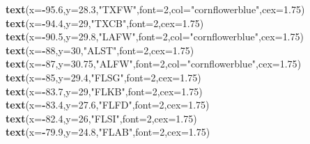 \documentclass[11pt,]{article}
\newenvironment{Shaded}{\begin{snugshade}}{\end{snugshade}}
\newcommand{\KeywordTok}[1]{\textcolor[rgb]{0.13,0.29,0.53}{\textbf{#1}}}
\newcommand{\DataTypeTok}[1]{\textcolor[rgb]{0.13,0.29,0.53}{#1}}
\newcommand{\DecValTok}[1]{\textcolor[rgb]{0.00,0.00,0.81}{#1}}
\newcommand{\FloatTok}[1]{\textcolor[rgb]{0.00,0.00,0.81}{#1}}
\newcommand{\StringTok}[1]{\textcolor[rgb]{0.31,0.60,0.02}{#1}}
\newcommand{\OperatorTok}[1]{\textcolor[rgb]{0.81,0.36,0.00}{\textbf{#1}}}
\newcommand{\NormalTok}[1]{#1}
\begin{document}
\begin{Shaded}
\begin{Highlighting}[]
\KeywordTok{text}\NormalTok{(}\DataTypeTok{x=}\OperatorTok{-}\FloatTok{95.6}\NormalTok{,}\DataTypeTok{y=}\FloatTok{28.3}\NormalTok{,}\StringTok{"TXFW"}\NormalTok{,}\DataTypeTok{font=}\DecValTok{2}\NormalTok{,}\DataTypeTok{col=}\StringTok{"cornflowerblue"}\NormalTok{,}\DataTypeTok{cex=}\FloatTok{1.75}\NormalTok{)}
\KeywordTok{text}\NormalTok{(}\DataTypeTok{x=}\OperatorTok{-}\FloatTok{94.4}\NormalTok{,}\DataTypeTok{y=}\DecValTok{29}\NormalTok{,}\StringTok{"TXCB"}\NormalTok{,}\DataTypeTok{font=}\DecValTok{2}\NormalTok{,}\DataTypeTok{cex=}\FloatTok{1.75}\NormalTok{)}
\KeywordTok{text}\NormalTok{(}\DataTypeTok{x=}\OperatorTok{-}\FloatTok{90.5}\NormalTok{,}\DataTypeTok{y=}\FloatTok{29.8}\NormalTok{,}\StringTok{"LAFW"}\NormalTok{,}\DataTypeTok{font=}\DecValTok{2}\NormalTok{,}\DataTypeTok{col=}\StringTok{"cornflowerblue"}\NormalTok{,}\DataTypeTok{cex=}\FloatTok{1.75}\NormalTok{)}
\KeywordTok{text}\NormalTok{(}\DataTypeTok{x=}\OperatorTok{-}\DecValTok{88}\NormalTok{,}\DataTypeTok{y=}\DecValTok{30}\NormalTok{,}\StringTok{"ALST"}\NormalTok{,}\DataTypeTok{font=}\DecValTok{2}\NormalTok{,}\DataTypeTok{cex=}\FloatTok{1.75}\NormalTok{)}
\KeywordTok{text}\NormalTok{(}\DataTypeTok{x=}\OperatorTok{-}\DecValTok{87}\NormalTok{,}\DataTypeTok{y=}\FloatTok{30.75}\NormalTok{,}\StringTok{"ALFW"}\NormalTok{,}\DataTypeTok{font=}\DecValTok{2}\NormalTok{,}\DataTypeTok{col=}\StringTok{"cornflowerblue"}\NormalTok{,}\DataTypeTok{cex=}\FloatTok{1.75}\NormalTok{)}
\KeywordTok{text}\NormalTok{(}\DataTypeTok{x=}\OperatorTok{-}\DecValTok{85}\NormalTok{,}\DataTypeTok{y=}\FloatTok{29.4}\NormalTok{,}\StringTok{"FLSG"}\NormalTok{,}\DataTypeTok{font=}\DecValTok{2}\NormalTok{,}\DataTypeTok{cex=}\FloatTok{1.75}\NormalTok{)}
\KeywordTok{text}\NormalTok{(}\DataTypeTok{x=}\OperatorTok{-}\FloatTok{83.7}\NormalTok{,}\DataTypeTok{y=}\DecValTok{29}\NormalTok{,}\StringTok{"FLKB"}\NormalTok{,}\DataTypeTok{font=}\DecValTok{2}\NormalTok{,}\DataTypeTok{cex=}\FloatTok{1.75}\NormalTok{)}
\KeywordTok{text}\NormalTok{(}\DataTypeTok{x=}\OperatorTok{-}\FloatTok{83.4}\NormalTok{,}\DataTypeTok{y=}\FloatTok{27.6}\NormalTok{,}\StringTok{"FLFD"}\NormalTok{,}\DataTypeTok{font=}\DecValTok{2}\NormalTok{,}\DataTypeTok{cex=}\FloatTok{1.75}\NormalTok{)}
\KeywordTok{text}\NormalTok{(}\DataTypeTok{x=}\OperatorTok{-}\FloatTok{82.4}\NormalTok{,}\DataTypeTok{y=}\DecValTok{26}\NormalTok{,}\StringTok{"FLSI"}\NormalTok{,}\DataTypeTok{font=}\DecValTok{2}\NormalTok{,}\DataTypeTok{cex=}\FloatTok{1.75}\NormalTok{)}
\KeywordTok{text}\NormalTok{(}\DataTypeTok{x=}\OperatorTok{-}\FloatTok{79.9}\NormalTok{,}\DataTypeTok{y=}\FloatTok{24.8}\NormalTok{,}\StringTok{"FLAB"}\NormalTok{,}\DataTypeTok{font=}\DecValTok{2}\NormalTok{,}\DataTypeTok{cex=}\FloatTok{1.75}\NormalTok{)}

\end{Highlighting}
\end{Shaded}
\end{document}
